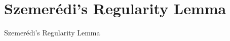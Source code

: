 \section{Szemer\'{e}di's Regularity Lemma}
\begin{frame}{Szemer\'{e}di's Regularity Lemma}
	
\end{frame}